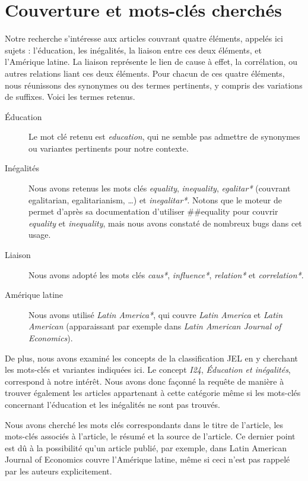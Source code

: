 \documentclass[pagesize, twoside=off, bibliography=totoc, DIV=calc, fontsize=12pt, a4paper, french]{scrartcl}
\begin{document}
\section{Couverture et mots-clés cherchés}
Notre recherche s’intéresse aux articles couvrant quatre éléments, appelés ici \og{}sujets\fg{} : l’éducation, les inégalités, la liaison entre ces deux éléments, et l’Amérique latine. La liaison représente le lien de cause à effet, la corrélation, ou autres relations liant ces deux éléments. Pour chacun de ces quatre éléments, nous réunissons des synonymes ou des termes pertinents, y compris des variations de suffixes. Voici les termes retenus.

\begin{description}
  \item[Éducation] Le mot clé retenu est \emph{education}, qui ne semble pas admettre de synonymes ou variantes pertinents pour notre contexte.
  \item[Inégalités] Nous avons retenus les mots clés \emph{equality}, \emph{inequality}, \emph{egalitar*} (couvrant egalitarian, egalitarianism, …) et \emph{inegalitar*}. Notons que le moteur de \citet{ebscohost_searching_2024} permet d’après sa documentation d’utiliser \#\#equality pour couvrir \emph{equality} et \emph{inequality}, mais nous avons constaté de nombreux bugs dans cet usage.
  \item[Liaison] Nous avons adopté les mots clés \emph{caus*}, \emph{influence*}, \emph{relation*} et \emph{correlation*}.
  \item[Amérique latine] Nous avons utilisé \emph{Latin America*}, qui couvre \emph{Latin America} et \emph{Latin American} (apparaissant par exemple dans \emph{Latin American Journal of Economics}). 
\end{description}
De plus, nous avons examiné les concepts de la classification JEL en y cherchant les mots-clés et variantes indiquées ici. Le concept \emph{I24}, \emph{Éducation et inégalités}, correspond à notre intérêt.
Nous avons donc façonné la requête de manière à trouver également les articles appartenant à cette catégorie même si les mots-clés concernant l’éducation et les inégalités ne sont pas trouvés.

Nous avons cherché les mots clés correspondants dans le titre de l’article, les mots-clés associés à l’article, le résumé et la source de l’article. Ce dernier point est dû à la possibilité qu’un article publié, par exemple, dans Latin American Journal of Economics couvre l’Amérique latine, même si ceci n’est pas rappelé par les auteurs explicitement.
\end{document}
